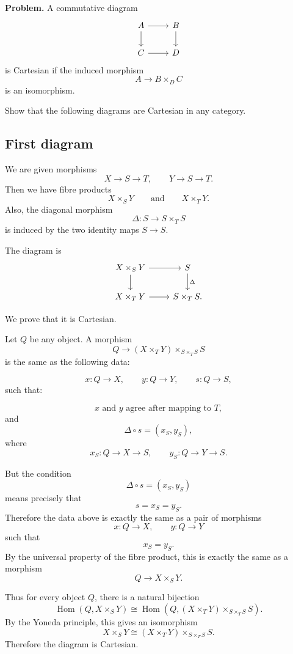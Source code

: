 \documentclass[12pt,a4paper]{article}
\theoremstyle{notespace}
\begin{document}
\textbf{Problem.}
A commutative diagram
\[
\begin{tikzcd}
	A \arrow[r] \arrow[d] & B \arrow[d] \\
	C \arrow[r] & D
\end{tikzcd}
\]
is Cartesian if the induced morphism
\[
A\longrightarrow B\times_D C
\]
is an isomorphism.

Show that the following diagrams are Cartesian in any category.

\subsection{First diagram}

We are given morphisms
\[
X\longrightarrow S\longrightarrow T,
\qquad
Y\longrightarrow S\longrightarrow T.
\]
Then we have fibre products
\[
X\times_S Y
\qquad\text{and}\qquad
X\times_T Y.
\]
Also, the diagonal morphism
\[
\Delta:S\longrightarrow S\times_T S
\]
is induced by the two identity maps \(S\to S\).

The diagram is
\[
\begin{tikzcd}
	X\times_S Y \arrow[r] \arrow[d]
	&
	S \arrow[d,"\Delta"]
	\\
	X\times_T Y \arrow[r]
	&
	S\times_T S.
\end{tikzcd}
\]

We prove that it is Cartesian.

Let \(Q\) be any object. A morphism
\[
Q\longrightarrow
(X\times_T Y)\times_{S\times_T S}S
\]
is the same as the following data:

\[
x:Q\to X,
\qquad
y:Q\to Y,
\qquad
s:Q\to S,
\]
such that:

\[
x \text{ and } y \text{ agree after mapping to } T,
\]
and
\[
\Delta\circ s
=
(x_S,y_S),
\]
where
\[
x_S:Q\to X\to S,
\qquad
y_S:Q\to Y\to S.
\]

But the condition
\[
\Delta\circ s=(x_S,y_S)
\]
means precisely that
\[
s=x_S=y_S.
\]
Therefore the data above is exactly the same as a pair of morphisms
\[
x:Q\to X,
\qquad
y:Q\to Y
\]
such that
\[
x_S=y_S.
\]
By the universal property of the fibre product, this is exactly the same
as a morphism
\[
Q\longrightarrow X\times_S Y.
\]

Thus for every object \(Q\), there is a natural bijection
\[
\operatorname{Hom}
\left(Q,X\times_S Y\right)
\cong
\operatorname{Hom}
\left(
Q,(X\times_T Y)\times_{S\times_T S}S
\right).
\]
By the Yoneda principle, this gives an isomorphism
\[
X\times_S Y
\cong
(X\times_T Y)\times_{S\times_T S}S.
\]
Therefore the diagram is Cartesian.
\end{document}

